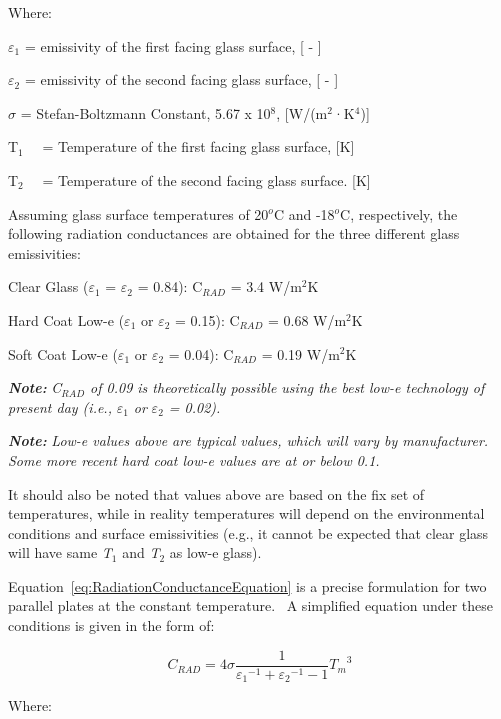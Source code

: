Where:

$\varepsilon$\(_{1}\) = emissivity of the first facing glass surface, {[} - {]}

$\varepsilon$\(_{2}\) = emissivity of the second facing glass surface, {[} - {]}

\(\sigma\) = Stefan-Boltzmann Constant, 5.67 x 10\(^{8}\), {[}W/(m\(^{2}\)·K\(^{4}\)){]}

T\(_{1}\)~~ = Temperature of the first facing glass surface, {[}K{]}

T\(_{2}\)~~ = Temperature of the second facing glass surface. {[}K{]}

Assuming glass surface temperatures of 20\(^{o}\)C and -18\(^{o}\)C, respectively, the following radiation conductances are obtained for the three different glass emissivities:

Clear Glass ($\varepsilon$\(_{1}\) = $\varepsilon$\(_{2}\) = 0.84): C\(_{RAD}\) = 3.4 W/m\(^{2}\)K

Hard Coat Low-e ($\varepsilon$\(_{1}\) or $\varepsilon$\(_{2}\) = 0.15): C\(_{RAD}\) = 0.68 W/m\(^{2}\)K

Soft Coat Low-e ($\varepsilon$\(_{1}\) or $\varepsilon$\(_{2}\) = 0.04): C\(_{RAD}\) = 0.19 W/m\(^{2}\)K

\textbf{\emph{Note:}} \emph{C\(_{RAD}\) of 0.09 is theoretically possible using the best low-e technology of present day (i.e.,} \emph{$\varepsilon$\(_{1}\) or} \emph{$\varepsilon$\(_{2}\) = 0.02).}

\textbf{\emph{Note:}} \emph{Low-e values above are typical values, which will vary by manufacturer.~ Some more recent hard coat low-e values are at or below 0.1.}

It should also be noted that values above are based on the fix set of temperatures, while in reality temperatures will depend on the environmental conditions and surface emissivities (e.g., it cannot be expected that clear glass will have same \emph{T\(_{1}\)} and \emph{T\(_{2}\)} as low-e glass).

Equation~\ref{eq:RadiationConductanceEquation} is a precise formulation for two parallel plates at the constant temperature.~ A simplified equation under these conditions is given in the form of:

\begin{equation}
{C_{RAD}} = 4\sigma \frac{1}{{{\varepsilon_1}^{ - 1} + {\varepsilon_2}^{ - 1} - 1}}{T_m}^3
\end{equation}

Where:

